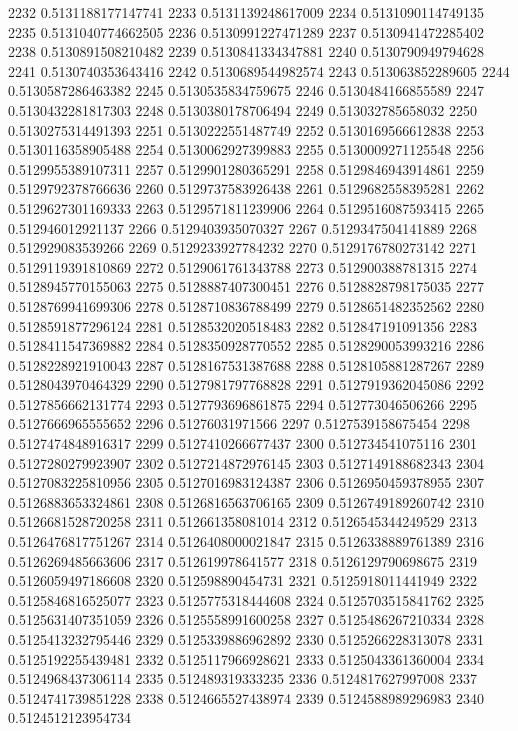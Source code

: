 2232 0.5131188177147741
2233 0.5131139248617009
2234 0.5131090114749135
2235 0.5131040774662505
2236 0.5130991227471289
2237 0.5130941472285402
2238 0.5130891508210482
2239 0.5130841334347881
2240 0.5130790949794628
2241 0.5130740353643416
2242 0.5130689544982574
2243 0.513063852289605
2244 0.5130587286463382
2245 0.5130535834759675
2246 0.5130484166855589
2247 0.5130432281817303
2248 0.5130380178706494
2249 0.513032785658032
2250 0.5130275314491393
2251 0.5130222551487749
2252 0.5130169566612838
2253 0.5130116358905488
2254 0.5130062927399883
2255 0.5130009271125548
2256 0.5129955389107311
2257 0.5129901280365291
2258 0.5129846943914861
2259 0.5129792378766636
2260 0.5129737583926438
2261 0.5129682558395281
2262 0.5129627301169333
2263 0.5129571811239906
2264 0.5129516087593415
2265 0.512946012921137
2266 0.5129403935070327
2267 0.5129347504141889
2268 0.512929083539266
2269 0.5129233927784232
2270 0.5129176780273142
2271 0.5129119391810869
2272 0.5129061761343788
2273 0.512900388781315
2274 0.5128945770155063
2275 0.5128887407300451
2276 0.5128828798175035
2277 0.5128769941699306
2278 0.5128710836788499
2279 0.5128651482352562
2280 0.5128591877296124
2281 0.5128532020518483
2282 0.512847191091356
2283 0.5128411547369882
2284 0.5128350928770552
2285 0.5128290053993216
2286 0.5128228921910043
2287 0.5128167531387688
2288 0.5128105881287267
2289 0.5128043970464329
2290 0.5127981797768828
2291 0.5127919362045086
2292 0.5127856662131774
2293 0.5127793696861875
2294 0.512773046506266
2295 0.5127666965555652
2296 0.51276031971566
2297 0.5127539158675454
2298 0.5127474848916317
2299 0.5127410266677437
2300 0.512734541075116
2301 0.5127280279923907
2302 0.5127214872976145
2303 0.5127149188682343
2304 0.5127083225810956
2305 0.5127016983124387
2306 0.5126950459378955
2307 0.5126883653324861
2308 0.5126816563706165
2309 0.5126749189260742
2310 0.5126681528720258
2311 0.512661358081014
2312 0.5126545344249529
2313 0.5126476817751267
2314 0.5126408000021847
2315 0.5126338889761389
2316 0.5126269485663606
2317 0.512619978641577
2318 0.5126129790698675
2319 0.5126059497186608
2320 0.512598890454731
2321 0.5125918011441949
2322 0.5125846816525077
2323 0.5125775318444608
2324 0.5125703515841762
2325 0.5125631407351059
2326 0.5125558991600258
2327 0.5125486267210334
2328 0.5125413232795446
2329 0.5125339886962892
2330 0.5125266228313078
2331 0.5125192255439481
2332 0.5125117966928621
2333 0.5125043361360004
2334 0.5124968437306114
2335 0.512489319333235
2336 0.5124817627997008
2337 0.5124741739851228
2338 0.5124665527438974
2339 0.5124588989296983
2340 0.5124512123954734
